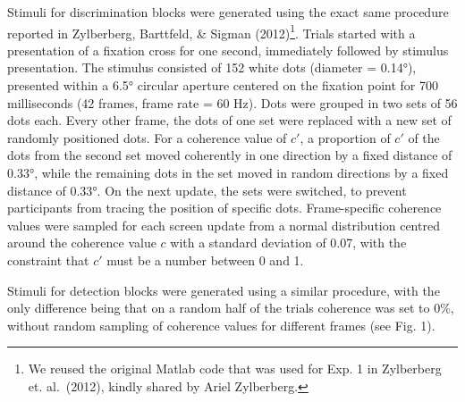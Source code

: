 \documentclass[12pt,twoside]{reedthesis}
\begin{document}
Stimuli for discrimination blocks were generated using the exact same procedure reported in Zylberberg, Barttfeld, \& Sigman (2012)\footnote{We reused the original Matlab code that was used for Exp. 1 in Zylberberg et. al.~(2012), kindly shared by Ariel Zylberberg.}. Trials started with a presentation of a fixation cross for one second, immediately followed by stimulus presentation. The stimulus consisted of 152 white dots (diameter = 0.14°), presented within a 6.5° circular aperture centered on the fixation point for 700 milliseconds (42 frames, frame rate = 60 Hz). Dots were grouped in two sets of 56 dots each. Every other frame, the dots of one set were replaced with a new set of randomly positioned dots. For a coherence value of \(c'\), a proportion of \(c'\) of the dots from the second set moved coherently in one direction by a fixed distance of 0.33°, while the remaining dots in the set moved in random directions by a fixed distance of 0.33°. On the next update, the sets were switched, to prevent participants from tracing the position of specific dots. Frame-specific coherence values were sampled for each screen update from a normal distribution centred around the coherence value \(c\) with a standard deviation of 0.07, with the constraint that \(c'\) must be a number between 0 and 1.

Stimuli for detection blocks were generated using a similar procedure, with the only difference being that on a random half of the trials coherence was set to 0\%, without random sampling of coherence values for different frames (see Fig. 1).
\end{document}
